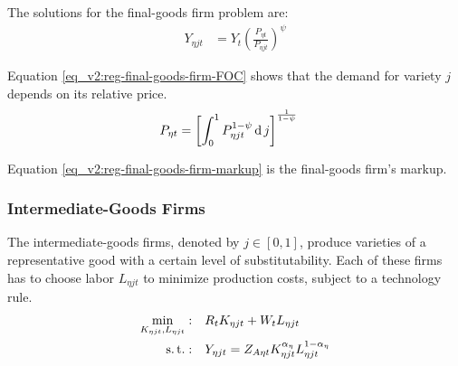 \documentclass[../thesis.tex]{subfiles}
\begin{document}

The solutions for the final-goods firm problem are:
\begin{align}
	Y_{\eta jt} &= Y_{t} \left( \frac{P_{\eta t}}{P_{\eta jt}} \right)^{\psi} \label{eq_v2:reg-final-goods-firm-FOC}
\end{align}

Equation \ref{eq_v2:reg-final-goods-firm-FOC} shows that the demand for variety $j$ depends on its relative price. 
\begin{alignat}{2}
	P_{\eta t} & = \left[ \int_{0}^{1} P_{\eta jt}^{1-\psi} \operatorname{d} j \right]^{\frac{1}{1-\psi}} \label{eq_v2:reg-final-goods-firm-markup}
\end{alignat}

Equation \ref{eq_v2:reg-final-goods-firm-markup} is the final-goods firm's markup.


\subsubsection{Intermediate-Goods Firms}


The intermediate-goods firms, denoted by $j \in [0,1]$, produce varieties of a representative good with a certain level of substitutability. Each of these firms has to choose labor $L_{\eta jt}$ to minimize production costs, subject to a technology rule.
\begin{align}
	\label{eq_v2:reg-int-good-firm-total-cost}
	\min_{K_{\eta jt}, L_{\eta jt}}: \quad & R_{t} K_{\eta jt} + W_t L_{\eta jt} \\
	\label{eq_v2:reg-int-good-firm-prod-function}
	\operatorname{s.t.}: \quad & Y_{\eta jt} = Z_{A\eta t} K_{\eta jt}^{\alpha_{\eta}} L_{\eta jt}^{1-{\alpha_{\eta}}}
\end{align}

\begin{comment}
	
	\begin{tcolorbox}[colback=red!5!white,colframe=red!75!black]
		“We set this parameter so that profits are zero in steady state” [Adolfson et al., 2014, p. 36] 
	\end{tcolorbox}	

\end{comment}
\end{document}
